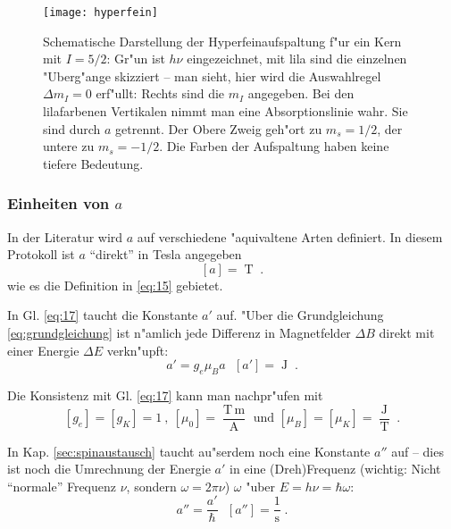 \documentclass[a4paper,12pt]{article}
\begin{document}
\begin{figure}[!h]
  \centering
  \texttt{[image: hyperfein]}
  \caption{Schematische Darstellung der Hyperfeinaufspaltung f"ur ein Kern mit
  $I = 5/2$: Gr"un ist $h\nu$ eingezeichnet, mit lila sind die einzelnen
  "Uberg"ange skizziert -- man sieht, hier wird die Auswahlregel $\Delta m_I =
  0$ erf"ullt: Rechts sind die $m_I$ angegeben. Bei den lilafarbenen Vertikalen
  nimmt man eine Absorptionslinie wahr. Sie sind durch $a$ getrennt. Der Obere
  Zweig geh"ort zu $m_s = 1/2$, der untere zu $m_s = -1/2$. Die Farben der
  Aufspaltung haben keine tiefere Bedeutung. }
  \label{fig:hyperfein_schema}
\end{figure}



\subsubsection{Einheiten von $a$}
\label{sec:einheiten_von_a}

In der Literatur wird $a$ auf verschiedene "aquivaltene Arten
definiert. In diesem Protokoll ist $a$ "`direkt"' in Tesla
angegeben
$$[a] = \operatorname{T} \;.$$
wie es die Definition in \eqref{eq:15} gebietet.

In Gl. \eqref{eq:17} taucht die Konstante $a'$ auf. "Uber die
Grundgleichung \eqref{eq:grundgleichung} ist n"amlich jede Differenz
in Magnetfelder $\Delta B$ direkt mit einer Energie $\Delta E$
verkn"upft:
\begin{equation}
  \label{eq:29}
  a' = g_e \mu_B a ~ ~ ~ [a'] = \operatorname{J} \;.
\end{equation}

Die Konsistenz mit Gl. \eqref{eq:17} kann man nachpr"ufen mit
$$
[g_e]=[g_K]=1 ~ , ~  [\mu_0] = \frac{\operatorname{T \,
    m}}{\operatorname{A}} \text{ und }
[\mu_B]=[\mu_K]=\frac{\operatorname{J}}{\operatorname{T}} \;.
$$


In Kap. \ref{sec:spinaustausch} taucht au"serdem noch eine Konstante
$a''$ auf -- dies ist noch die Umrechnung der Energie $a'$ in eine
(Dreh)Frequenz (wichtig: Nicht "`normale"' Frequenz $\nu$, sondern
$\omega = 2\pi\nu$) $\omega$ "uber $E = h\nu = \hbar \omega$:
\begin{equation}
  \label{eq:30}
  a'' = \frac{ a' }{ \hbar } ~ ~ ~ [a''] = \frac 1 {\operatorname{s}} \;.
\end{equation}
\end{document}
